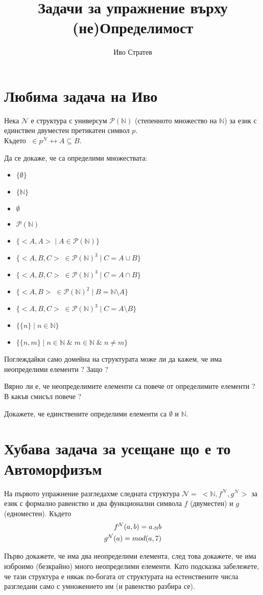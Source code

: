 \documentclass[12pt]{article}
\title{Задачи за упражнение върху (не)Определимост}
\author{Иво Стратев}
\begin{document}
\maketitle

\section{Любима задача на Иво}
Нека \(\mathcal{N}\) е структура с универсум \(\mathcal{P}(\mathbb{N})\) (степенното множество на \(\mathbb{N}\)) за език с единствен двуместен претикатен символ \(p\). \\
Където \(<A, B> \; \in p^{\mathcal{N}} \longleftrightarrow A \subseteq B\).

Да се докаже, че са определими множествата:
\begin{itemize}
    \item \(\{\emptyset\}\)
    \item \(\{\mathbb{N}\}\)
    \item \(\emptyset\)
    \item \(\mathcal{P}(\mathbb{N})\)
    \item \(\{<A, A> \; | \; A \in \mathcal{P}(\mathbb{N})\}\)
    \item \(\{<A, B, C> \; \in \mathcal{P}(\mathbb{N})^3 \; | \; C = A \cup B \}\)
    \item \(\{<A, B, C> \; \in \mathcal{P}(\mathbb{N})^3 \; | \; C = A \cap B \}\)
    \item \(\{<A, B> \; \in \mathcal{P}(\mathbb{N})^2 \; | \; B = \mathbb{N} \setminus A \}\)
    \item \(\{<A, B, C> \; \in \mathcal{P}(\mathbb{N})^3 \; | \; C = A \setminus B \}\)
    \item \(\{ \{n\} \; | \; n \in \mathbb{N}\} \)
    \item \(\{ \{n, m\} \; | \; n \in \mathbb{N} \; \& \; m \in \mathbb{N} \; \& \; n \neq m\} \)
\end{itemize}

Поглеждайки само домейна на структурата може ли да кажем, че има неопределими елементи ? Защо ?

Вярно ли е, че неопределимите елементи са повече от определимите елементи ? В какъв смисъл повече ?

Докажете, че единствените определими елементи са \(\emptyset\) и \(\mathbb{N}\).

\section{Хубава задача за усещане що е то Автоморфизъм}
На първото упражнение разгледахме следната структура 
\(\mathcal{N} = \; <\mathbb{N}, f^{\mathcal{N}}, g^{\mathcal{N}}>\)
за език с формално равенство и два функционални символа \(f\) (двуместен) и \(g\) (едноместен). Където
\begin{align*}
    f^{\mathcal{N}}(a, b) = a ._{\small\mathbb{N}} b \\
    g^{\mathcal{N}}(a) = mod(a, 7)
\end{align*}

Първо докажете, че има два неопределими елемента, след това докажете, че има изброимо (безкрайно) много неопределими елементи. Като подсказка забележете, че тази структура е  някак по-богата от структурата на естенствените числа разгледани само с умножението им (и равенство разбира се). 
\end{document}
